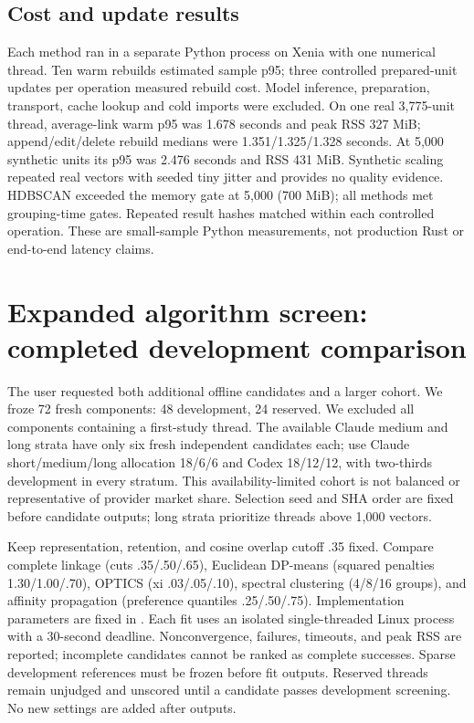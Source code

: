 \documentclass[11pt]{article}
\begin{document}
\subsection{Cost and update results}
Each method ran in a separate Python process on Xenia with one numerical thread.
Ten warm rebuilds estimated sample p95; three controlled prepared-unit updates
per operation measured rebuild cost. Model inference, preparation, transport,
cache lookup and cold imports were excluded. On one real 3,775-unit thread,
average-link warm p95 was 1.678 seconds and peak RSS 327 MiB; append/edit/delete
rebuild medians were 1.351/1.325/1.328 seconds. At 5,000 synthetic units its
p95 was 2.476 seconds and RSS 431 MiB. Synthetic scaling repeated real vectors
with seeded tiny jitter and provides no quality evidence. HDBSCAN exceeded the
memory gate at 5,000 (700 MiB); all methods met grouping-time gates. Repeated
result hashes matched within each controlled operation. These are small-sample
Python measurements, not production Rust or end-to-end latency claims.

\section{Expanded algorithm screen: completed development comparison}
The user requested both additional offline candidates and a larger cohort.
We froze 72 fresh components: 48 development, 24 reserved. We excluded all components
containing a first-study thread. The available Claude medium and long strata
have only six fresh independent candidates each; use Claude short/medium/long
allocation 18/6/6 and Codex 18/12/12, with two-thirds development in every stratum.
This availability-limited cohort is not balanced or representative of provider
market share. Selection seed and SHA order are fixed before candidate outputs;
long strata prioritize threads above 1,000 vectors.

Keep representation, retention, and cosine overlap cutoff .35 fixed. Compare
complete linkage (cuts .35/.50/.65), Euclidean DP-means \cite{dpmeans}
(squared penalties 1.30/1.00/.70), OPTICS (xi .03/.05/.10), spectral clustering
(4/8/16 groups), and affinity propagation (preference quantiles .25/.50/.75).
Implementation parameters are fixed in
. Each fit uses an isolated
single-threaded Linux process with a 30-second deadline. Nonconvergence, failures,
timeouts, and peak RSS are reported; incomplete candidates cannot be ranked as
complete successes. Sparse development references must be frozen before fit
outputs. Reserved threads remain unjudged and unscored until a candidate passes
development screening. No new settings are added after outputs.
\end{document}
